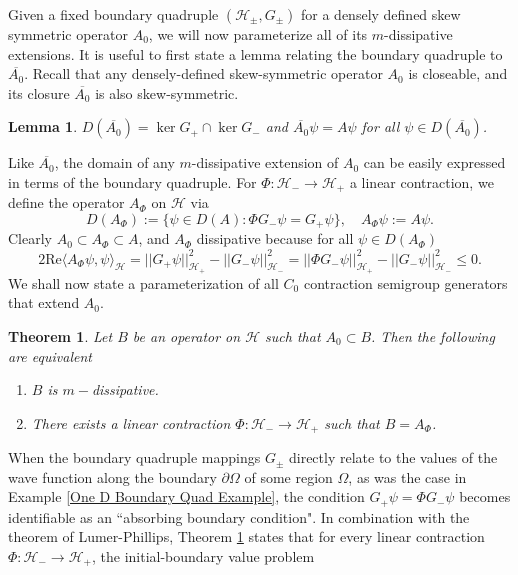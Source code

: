 \documentclass{article}
\numberwithin{equation}{section}
\newtheorem{theorem}{Theorem}[section]
\newtheorem{lemma}{Lemma}[section]
\begin{document}
Given a fixed boundary quadruple $(\mathcal{H}_\pm, {G}_\pm)$ for a densely defined skew symmetric operator $A_0$, we will now parameterize all of its $m$-dissipative extensions. It is useful to first state a lemma relating the boundary quadruple to $\overline{A_0}$. Recall that any densely-defined skew-symmetric operator $A_0$ is closeable, and its closure $\overline{A_0}$ is also skew-symmetric.
\begin{lemma}\label{Closure} \cite[Proposition 3.9]{Arendt2023}
$D(\overline{A_0})=\ker G_+ \cap \ker G_-$ and $\overline{A_0}\psi=A\psi$ for all $\psi \in D(\overline{A_0})$.
\end{lemma}
Like $\overline{A_0}$, the domain of any $m$-dissipative extension of $A_0$ can be easily expressed in terms of the boundary quadruple. For $\Phi:\mathcal{H}_- \to \mathcal{H}_+$ a linear contraction, we define the operator $A_\Phi$ on $\mathcal{H}$ via
\begin{equation}
    D(A_\Phi):= \{\psi \in D(A): \Phi G_- \psi= G_+ \psi \}, \quad A_\Phi \psi:= A\psi.
\end{equation}
Clearly $A_0 \subset A_\Phi \subset A$, and $A_\Phi$ dissipative because for all $\psi \in D(A_\Phi)$
\begin{equation}\label{Probability Contracting}
    2\text{Re}\langle A_\Phi \psi, \psi \rangle_{\mathcal{H}}= ||G_+\psi||_{\mathcal{H}_+}^2 - ||G_-\psi||_{\mathcal{H}_-}^2=||\Phi G_-\psi||_{\mathcal{H}_+}^2 - ||G_-\psi||_{\mathcal{H}_-}^2 \leq 0.
\end{equation}
We shall now state a parameterization of all $C_0$ contraction semigroup generators that extend $A_0$.
\begin{theorem}\label{Description}
    \cite[Theorem 3.10]{Arendt2023}  Let $B$ be an operator on $\mathcal{H}$ such that $A_0 \subset B$. Then the following are equivalent
    \begin{enumerate}
        \item[(a)] $B$ is $m-$dissipative.
        \item[(b)] There exists a linear contraction $\Phi:\mathcal{H_-}\to \mathcal{H}_+$ such that $B=A_\Phi$.
    \end{enumerate}
\end{theorem}
When the boundary quadruple mappings $G_\pm$ directly relate to the values of the wave function along the boundary $\partial \Omega$ of some region $\Omega$, as was the case in Example \ref{One D Boundary Quad Example}, the condition $G_+\psi=\Phi G_-\psi$ becomes identifiable as an ``absorbing boundary condition". In combination with the theorem of Lumer-Phillips, Theorem \ref{Description} states that for every linear contraction $\Phi:\mathcal{H}_- \to \mathcal{H}_+$, the initial-boundary value problem
\end{document}
